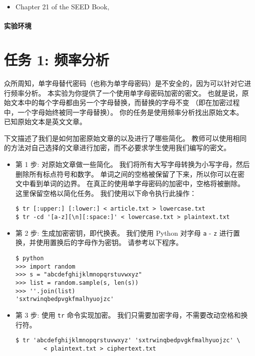 \begin{itemize}
\item Chapter 21 of the SEED Book, \seedbook
\end{itemize}


\paragraph{实验环境} \seedenvironmentB




\section{任务 1: 频率分析}

众所周知，单字母替代密码（也称为单字母密码）是不安全的，因为可以针对它进行频率分析。
本实验为你提供了一个使用单字母密码加密的密文。
也就是说，原始文本中的每个字母都由另一个字母替换，而替换的字母不变
（即在加密过程中，一个字母始终被同一字母替换）。
你的任务是使用频率分析找出原始文本。
已知原始文本是英文文章。


下文描述了我们是如何加密原始文章的以及进行了哪些简化。
教师可以使用相同的方法对自己选择的文章进行加密，而不必要求学生使用我们编写的密文。

\begin{itemize}

\item 第 1 步:
对原始文章做一些简化。
我们将所有大写字母转换为小写字母，然后删除所有标点符号和数字。
单词之间的空格被保留了下来，所以你可以在密文中看到单词的边界。
在真正的使用单字母密码的加密中，空格将被删除。
这里保留空格以简化任务。
我们使用以下命令执行此操作：

\begin{lstlisting}
$ tr [:upper:] [:lower:] < article.txt > lowercase.txt
$ tr -cd '[a-z][\n][:space:]' < lowercase.txt > plaintext.txt
\end{lstlisting}


\item 第 2 步:
生成加密密钥，即代换表。
我们使用 Python 对字母 \texttt{a} - \texttt{z} 进行置换，并使用置换后的字母作为密钥。
请参考以下程序。

\begin{lstlisting}
$ python
>>> import random
>>> s = "abcdefghijklmnopqrstuvwxyz"
>>> list = random.sample(s, len(s))
>>> ''.join(list)
'sxtrwinqbedpvgkfmalhyuojzc'
\end{lstlisting}


\item 第 3 步:
使用 \texttt{tr} 命令实现加密。
我们只需要加密字母，不需要改动空格和换行符。


\begin{lstlisting}
$ tr 'abcdefghijklmnopqrstuvwxyz' 'sxtrwinqbedpvgkfmalhyuojzc' \
        < plaintext.txt > ciphertext.txt
\end{lstlisting}

\end{itemize}


